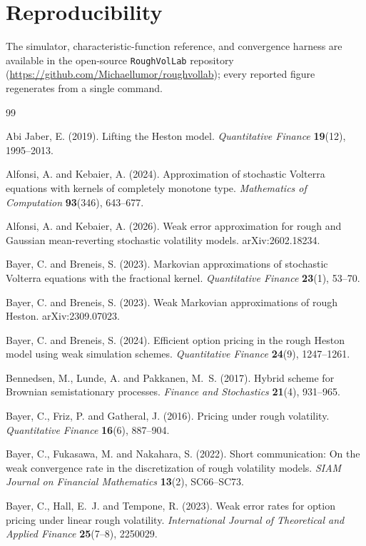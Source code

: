 \documentclass{siamonline250211}
\begin{document}
\section*{Reproducibility}
The simulator, characteristic-function reference, and convergence harness are available in
the open-source \texttt{RoughVolLab} repository
(\url{https://github.com/Michaellumor/roughvollab}); every reported figure regenerates from
a single command.

\begin{thebibliography}{99}

 Abi Jaber, E. (2019).
Lifting the Heston model. \emph{Quantitative Finance} \textbf{19}(12), 1995--2013.

 Alfonsi, A. and Kebaier, A. (2024).
Approximation of stochastic Volterra equations with kernels of completely
monotone type. \emph{Mathematics of Computation} \textbf{93}(346), 643--677.

 Alfonsi, A. and Kebaier, A. (2026).
Weak error approximation for rough and Gaussian mean-reverting stochastic
volatility models. arXiv:2602.18234.

 Bayer, C. and Breneis, S. (2023).
Markovian approximations of stochastic Volterra equations with the fractional kernel.
\emph{Quantitative Finance} \textbf{23}(1), 53--70.

 Bayer, C. and Breneis, S. (2023).
Weak Markovian approximations of rough Heston. arXiv:2309.07023.

 Bayer, C. and Breneis, S. (2024).
Efficient option pricing in the rough Heston model using weak simulation schemes.
\emph{Quantitative Finance} \textbf{24}(9), 1247--1261.

 Bennedsen, M., Lunde, A. and Pakkanen, M.~S. (2017).
Hybrid scheme for Brownian semistationary processes.
\emph{Finance and Stochastics} \textbf{21}(4), 931--965.

 Bayer, C., Friz, P. and Gatheral, J. (2016).
Pricing under rough volatility.
\emph{Quantitative Finance} \textbf{16}(6), 887--904.

 Bayer, C., Fukasawa, M. and Nakahara, S. (2022).
Short communication: On the weak convergence rate in the discretization of
rough volatility models. \emph{SIAM Journal on Financial Mathematics} \textbf{13}(2), SC66--SC73.

 Bayer, C., Hall, E.~J. and Tempone, R. (2023).
Weak error rates for option pricing under linear rough volatility.
\emph{International Journal of Theoretical and Applied Finance} \textbf{25}(7--8), 2250029.


\end{thebibliography}
\end{document}
